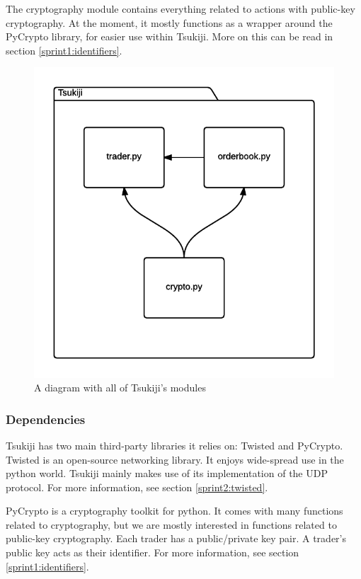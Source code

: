 The cryptography module contains everything related to actions with public-key cryptography.
At the moment, it mostly functions as a wrapper around the PyCrypto library, for easier use within Tsukiji.
More on this can be read in section \ref{sprint1:identifiers}.

\begin{figure}
  \centering
  \includegraphics[width=\textwidth]{modules}
  \caption{A diagram with all of Tsukiji's modules}
  \label{modulesfig}
\end{figure}

\subsubsection{Dependencies}
\label{dependencies}
Tsukiji has two main third-party libraries it relies on: Twisted\cite{twisted} and PyCrypto\cite{pycrypto}.
Twisted is an open-source networking library.
It enjoys wide-spread use in the python world.
Tsukiji mainly makes use of its implementation of the UDP protocol.
For more information, see section \ref{sprint2:twisted}.

PyCrypto is a cryptography toolkit for python.
It comes with many functions related to cryptography, but we are mostly interested in functions related to public-key cryptography.
Each trader has a public/private key pair.
A trader's public key acts as their identifier.
For more information, see section \ref{sprint1:identifiers}.

